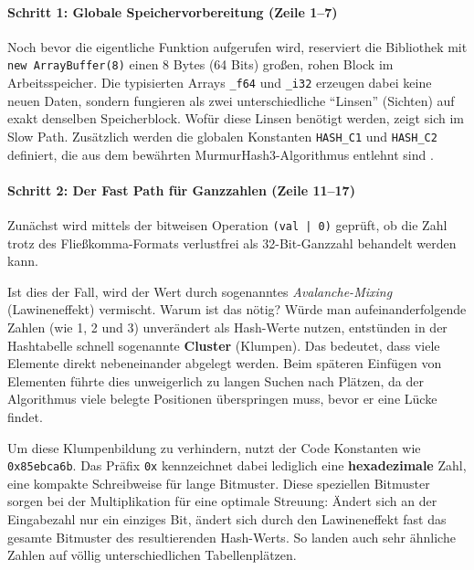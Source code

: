 \paragraph*{Schritt 1: Globale Speichervorbereitung (Zeile 1–7)}
Noch bevor die eigentliche Funktion aufgerufen wird, reserviert die Bibliothek mit \texttt{new ArrayBuffer(8)} einen 8 Bytes (64 Bits) großen, rohen Block im Arbeitsspeicher. Die typisierten Arrays \texttt{_f64} und \texttt{_i32} erzeugen dabei keine neuen Daten, sondern fungieren als zwei unterschiedliche \enquote{Linsen} (Sichten) auf exakt denselben Speicherblock. Wofür diese Linsen benötigt werden, zeigt sich im Slow Path. Zusätzlich werden die globalen Konstanten \texttt{HASH_C1} und \texttt{HASH_C2} definiert, die aus dem bewährten MurmurHash3-Algorithmus entlehnt sind \autocite{appleby2008murmurhash}.

\paragraph*{Schritt 2: Der Fast Path für Ganzzahlen (Zeile 11–17)}
Zunächst wird mittels der bitweisen Operation \texttt{(val | 0)} geprüft, ob die Zahl trotz des Fließkomma-Formats verlustfrei als 32-Bit-Ganzzahl behandelt werden kann. 

Ist dies der Fall, wird der Wert durch sogenanntes \textit{Avalanche-Mixing} (Lawineneffekt) vermischt. Warum ist das nötig? Würde man aufeinanderfolgende Zahlen (wie 1, 2 und 3) unverändert als Hash-Werte nutzen, entstünden in der Hashtabelle schnell sogenannte \textbf{Cluster} (Klumpen). Das bedeutet, dass viele Elemente direkt nebeneinander abgelegt werden. Beim späteren Einfügen von Elementen führte dies unweigerlich zu langen Suchen nach Plätzen, da der Algorithmus viele belegte Positionen überspringen muss, bevor er eine Lücke findet.

Um diese Klumpenbildung zu verhindern, nutzt der Code Konstanten wie \texttt{0x85ebca6b}. Das Präfix \texttt{0x} kennzeichnet dabei lediglich eine \textbf{hexadezimale} Zahl, eine kompakte Schreibweise für lange Bitmuster. Diese speziellen Bitmuster sorgen bei der Multiplikation für eine optimale Streuung: Ändert sich an der Eingabezahl nur ein einziges Bit, ändert sich durch den Lawineneffekt fast das gesamte Bitmuster des resultierenden Hash-Werts. So landen auch sehr ähnliche Zahlen auf völlig unterschiedlichen Tabellenplätzen.

